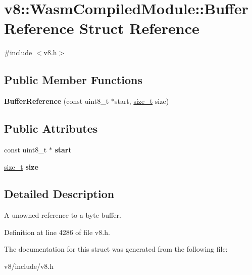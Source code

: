 \hypertarget{structv8_1_1WasmCompiledModule_1_1BufferReference}{}\section{v8\+:\+:Wasm\+Compiled\+Module\+:\+:Buffer\+Reference Struct Reference}
\label{structv8_1_1WasmCompiledModule_1_1BufferReference}


{\ttfamily \#include $<$v8.\+h$>$}

\subsection*{Public Member Functions}
\begin{DoxyCompactItemize}
\item 
\mbox{\label{structv8_1_1WasmCompiledModule_1_1BufferReference_ad46931134873606a9847ca2b5c464ec7}} 
{\bfseries Buffer\+Reference} (const uint8\+\_\+t $\ast$start, \mbox{\hyperlink{classsize__t}{size\+\_\+t}} size)
\end{DoxyCompactItemize}
\subsection*{Public Attributes}
\begin{DoxyCompactItemize}
\item 
\mbox{\label{structv8_1_1WasmCompiledModule_1_1BufferReference_a9ac4a0945b75f31d78b7b799571d1c62}} 
const uint8\+\_\+t $\ast$ {\bfseries start}
\item 
\mbox{\label{structv8_1_1WasmCompiledModule_1_1BufferReference_a8ea480c872a380496cd7f44c56f542cf}} 
\mbox{\hyperlink{classsize__t}{size\+\_\+t}} {\bfseries size}
\end{DoxyCompactItemize}


\subsection{Detailed Description}
A unowned reference to a byte buffer. 

Definition at line 4286 of file v8.\+h.



The documentation for this struct was generated from the following file\+:\begin{DoxyCompactItemize}
\item 
v8/include/v8.\+h\end{DoxyCompactItemize}

